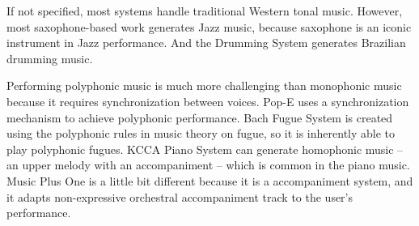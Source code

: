 If not specified, most systems handle traditional Western tonal music. However, most saxophone-based work \cite{40, 41, 42} generates Jazz music, because saxophone is an iconic instrument in Jazz performance. And the Drumming System \cite{56} generates Brazilian drumming music.%

Performing polyphonic music is much more challenging than monophonic music because it requires synchronization between voices. Pop-E \cite{28} uses a synchronization mechanism to achieve polyphonic performance. Bach Fugue System \cite{23} is created using the polyphonic rules in music theory on fugue, so it is inherently able to play polyphonic fugues. KCCA Piano System \cite{57} can generate homophonic music -- an upper melody with an accompaniment -- which is common in the piano music.  Music Plus One \cite{52,53,54} is a little bit different because it is a accompaniment system, and it adapts non-expressive orchestral accompaniment track to the user's performance. %


